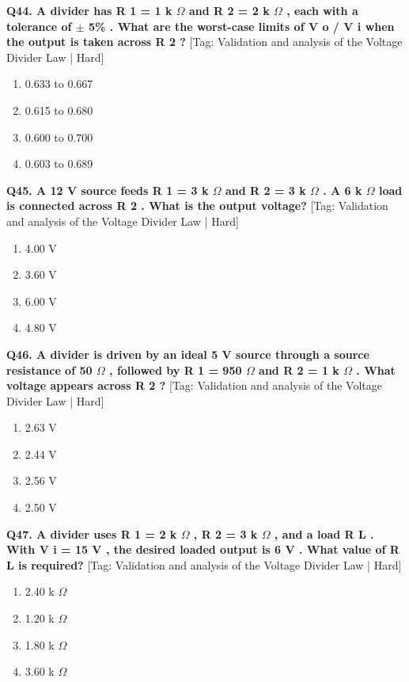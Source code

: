 \noindent\textbf{Q44. A divider has R 1 = 1 k $\Omega$ and R 2 = 2 k $\Omega$ , each with a tolerance of $\pm$ 5\% . What are the worst-case limits of V o / V i when the output is taken across R 2 ?} \hfill [Tag: Validation and analysis of the Voltage Divider Law | Hard]
\begin{enumerate}[label=(\alph*),topsep=2pt,itemsep=1pt,partopsep=0pt,parsep=0pt]
    \item {0.633 to 0.667}
    \item {0.615 to 0.680}
    \item {0.600 to 0.700}
    \item {0.603 to 0.689}
\end{enumerate}
\vspace{2mm}

\noindent\textbf{Q45. A 12 V source feeds R 1 = 3 k $\Omega$ and R 2 = 3 k $\Omega$ . A 6 k $\Omega$ load is connected across R 2 . What is the output voltage?} \hfill [Tag: Validation and analysis of the Voltage Divider Law | Hard]
\begin{enumerate}[label=(\alph*),topsep=2pt,itemsep=1pt,partopsep=0pt,parsep=0pt]
    \item {4.00 V}
    \item {3.60 V}
    \item {6.00 V}
    \item {4.80 V}
\end{enumerate}
\vspace{2mm}

\noindent\textbf{Q46. A divider is driven by an ideal 5 V source through a source resistance of 50 $\Omega$ , followed by R 1 = 950 $\Omega$ and R 2 = 1 k $\Omega$ . What voltage appears across R 2 ?} \hfill [Tag: Validation and analysis of the Voltage Divider Law | Hard]
\begin{enumerate}[label=(\alph*),topsep=2pt,itemsep=1pt,partopsep=0pt,parsep=0pt]
    \item {2.63 V}
    \item {2.44 V}
    \item {2.56 V}
    \item {2.50 V}
\end{enumerate}
\vspace{2mm}

\noindent\textbf{Q47. A divider uses R 1 = 2 k $\Omega$ , R 2 = 3 k $\Omega$ , and a load R L . With V i = 15 V , the desired loaded output is 6 V . What value of R L is required?} \hfill [Tag: Validation and analysis of the Voltage Divider Law | Hard]
\begin{enumerate}[label=(\alph*),topsep=2pt,itemsep=1pt,partopsep=0pt,parsep=0pt]
    \item {2.40 k $\Omega$}
    \item {1.20 k $\Omega$}
    \item {1.80 k $\Omega$}
    \item {3.60 k $\Omega$}
\end{enumerate}
\vspace{2mm}

